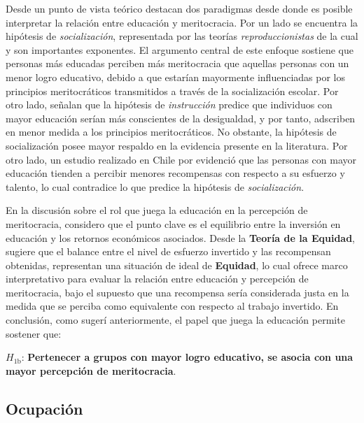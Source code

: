 \documentclass[12pt]{article}
\begin{document}
Desde un punto de vista teórico \citet{Duru-bellat2012} destacan dos paradigmas desde donde es posible interpretar la relación entre educación y meritocracia. Por un lado se encuentra la hipótesis de \emph{socialización}, representada por las teorías \emph{reproduccionistas} de la cual \citet{Bernstein2003} y \citet{Bourdieu1981} son importantes exponentes. El argumento central de este enfoque sostiene que personas más educadas perciben más meritocracia que aquellas personas con un menor logro educativo, debido a que estarían mayormente influenciadas por los principios meritocráticos transmitidos a través de la socialización escolar. Por otro lado, \citet{Duru-bellat2012} señalan que la hipótesis de \emph{instrucción} predice que individuos con mayor educación serían más conscientes de la desigualdad, y por tanto, adscriben en menor medida a los principios meritocráticos. No obstante, la hipótesis de socialización posee mayor respaldo en la evidencia presente en la literatura. Por otro lado, un estudio realizado en Chile por \cite{Castillo2018} evidenció que las personas con mayor educación tienden a percibir menores recompensas con respecto a su esfuerzo y talento, lo cual contradice lo que predice la hipótesis de \emph{socialización}. 

En la discusión sobre el rol que juega la educación en la percepción de meritocracia, considero que el punto clave es el equilibrio entre la inversión en educación y los retornos económicos asociados. Desde la \textbf{Teoría de la Equidad}, \citet{Adams1965} sugiere que el balance entre el nivel de esfuerzo invertido y las recompensan obtenidas, representan una situación de ideal de \textbf{Equidad}, lo cual ofrece marco interpretativo para evaluar la relación entre educación y percepción de meritocracia, bajo el supuesto que una recompensa sería considerada justa en la medida que se perciba como equivalente con respecto al trabajo invertido. En conclusión, como sugerí anteriormente, el papel que juega la educación permite sostener que: 

$H_{\text{1b}}$: \textbf{Pertenecer a grupos con mayor logro educativo, se asocia con una mayor percepción de meritocracia}.          

\subsection*{Ocupación}
\end{document}
